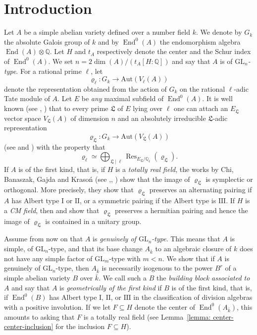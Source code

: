 \documentclass[oneside]{amsart}
\theoremstyle{remark}
\newcommand{\Q}{\mathbb Q}
\newcommand{\kbar}{{\bar{k}}}
\newcommand{\GL}{\mathrm{GL}}
\newcommand{\Aut}{\mathrm{Aut}}
\newcommand{\End}{\operatorname{End}}
\newcommand{\Res}{\operatorname{Res}}
\newcommand{\I}{\mathrm{I}}
\newcommand{\II}{\mathrm{II}}
\newcommand{\III}{\mathrm{III}}
\newcommand{\Ll}{\mathfrak{L}}
\numberwithin{equation}{section}
\begin{document}
\section{Introduction}

Let $A$ be a simple abelian variety defined over a number field $k$. We denote by $G_k$ the absolute Galois group of $k$ and by $\End^0(A)$ the endomorphism algebra $\End(A)\otimes \Q$. Let $H$ and $t_A$ respectively denote the center and the Schur index of $\End^0(A)$. We set $n=2\dim(A)/(t_A[H:\Q])$ and say that $A$ is of \emph{$\GL_n$-type}. For a rational prime $\ell$, let 
$$
\varrho_\ell:G_k\rightarrow \Aut(V_\ell(A))
$$
denote the representation obtained from the action of $G_k$ on the rational $\ell$-adic Tate module of $A$. Let $E$ be \emph{any} maximal subfield of $\End^0(A)$. It is well known (see \cite{Rib76}, \cite{Shi98}) that to every prime $\Ll$ of $E$ lying over $\ell$ one can attach an $E_\Ll$ vector space $V_{\Ll}(A)$ of dimension $n$ and an absolutely irreducible $\Ll$-adic representation
$$
\varrho_\Ll:G_k\rightarrow \Aut(V_\Ll(A))
$$
(see \cite{Zar89} and \cite{Chi87}) with the property that 
$$
\varrho_\ell\simeq \bigoplus_{\Ll\mid \ell} \Res_{E_{\Ll}/\Q_\ell}(\varrho_{\Ll}).
$$
If $A$ is of the first kind, that is, if $H$ is a \emph{totally real field}, the works by Chi, Banaszak, Gajda and Kraso\'n (see \cite{Chi90},\cite{BGK06}, \cite{BGK10}) show that the image of $\varrho_\Ll$ is symplectic or orthogonal. More precisely, they show that $\varrho_\Ll$ preserves an alternating pairing if $A$ has Albert type $\I$ or $\II$, or a symmetric pairing if the Albert type is $\III$. If $H$ is a \emph{CM field}, then \cite{BKG21} and \cite{Chi91} show that $\varrho_\Ll$ preserves a hermitian pairing and hence the image of $\varrho_\Ll$ is contained in a unitary group.
 

Assume from now on that $A$ is \emph{genuinely of $\GL_n$-type}. This means that $A$ is simple, of $\GL_n$-type, and that its base change $A_\kbar$ to an algebraic closure of $k$ does not have any simple factor of $\GL_m$-type with $m<n$.
We show that if $A$ is genuinely of $\GL_n$-type, then $A_\kbar$ is necessarily isogenous to the power $B^r$ of a simple abelian variety $B$ over $\kbar$. We call such a $B$ the \emph{building block associated to $A$} and say that $A$ is \emph{geometrically of the first kind} if $B$ is of the first kind, that is, if $\End^0(B)$ has Albert type $\I$, $\II$, or $\III$ in the classification of division algebras with a positive involution. If we let $F\subseteq H$ denote the center of $\End^0(A_\kbar)$, this amounts to asking that $F$ is a totally real field (see Lemma~\ref{lemma: center-center-inclusion} for the inclusion $F \subseteq H$).
\end{document}
